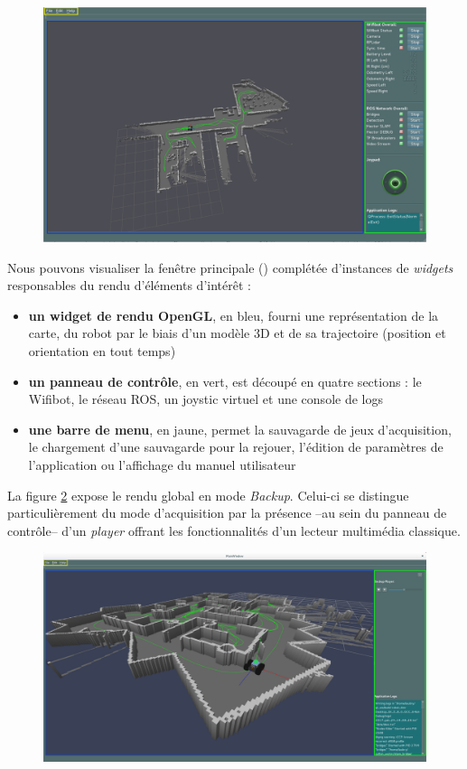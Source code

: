 \begin{figure}[h]
  \centering
    \includegraphics[width=1.\linewidth]{figures/slam-widget}  
  \label{fig:reception}
\end{figure}

Nous pouvons visualiser la fenêtre principale () complétée d'instances de \emph{widgets} responsables du rendu d'éléments d'intérêt : 
\begin{itemize}
 \item \textbf{un widget de rendu OpenGL}, en bleu, fourni une représentation de la carte, du robot par le biais d'un modèle 3D et de sa trajectoire (position et orientation en tout temps)
 \item \textbf{un panneau de contrôle}, en vert, est découpé en quatre sections : le Wifibot, le réseau ROS, un joystic virtuel et une console de logs 
 \item \textbf{une barre de menu}, en jaune, permet la sauvagarde de jeux d'acquisition, le chargement d'une sauvagarde pour la rejouer, l'édition de paramètres de l'application ou l'affichage du manuel utilisateur
\end{itemize}

La figure \ref{fig:replay} expose le rendu global en mode \emph{Backup}. 
Celui-ci se distingue particulièrement du mode d'acquisition par la présence --au sein du panneau de contrôle-- d'un \emph{player} offrant les fonctionnalités d'un lecteur multimédia classique.

\begin{figure}[h]  
  \centering
    \includegraphics[width=1.\linewidth]{figures/slam-backup}  
  \label{fig:replay}
\end{figure}

